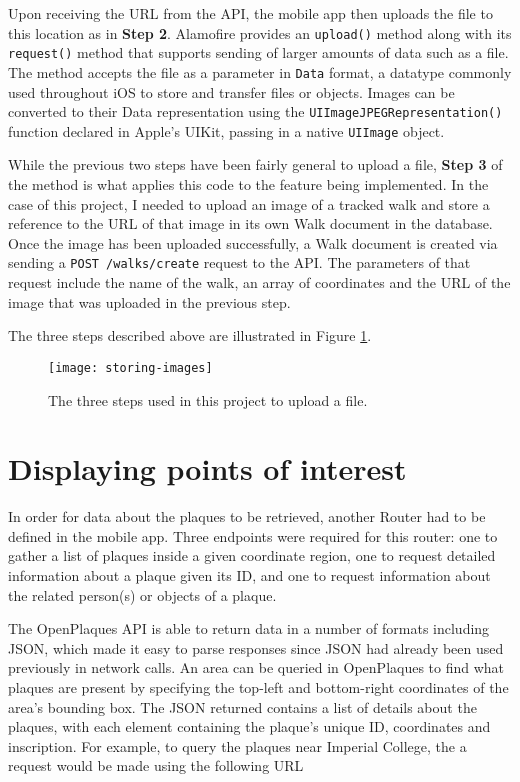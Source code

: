 Upon receiving the URL from the API, the mobile app then uploads the file to this location as in \textbf{Step 2}. Alamofire provides an \texttt{upload()} method along with its \texttt{request()} method that supports sending of larger amounts of data such as a file. The method accepts the file as a parameter in \texttt{Data} format, a datatype commonly used throughout iOS to store and transfer files or objects. Images can be converted to their Data representation using the \texttt{UIImageJPEGRepresentation()} function declared in Apple's UIKit, passing in a native \texttt{UIImage} object.

While the previous two steps have been fairly general to upload a file, \textbf{Step 3} of the method is what applies this code to the feature being implemented. In the case of this project, I needed to upload an image of a tracked walk and store a reference to the URL of that image in its own Walk document in the database. Once the image has been uploaded successfully, a Walk document is created via sending a \texttt{POST /walks/create} request to the API. The parameters of that request include the name of the walk, an array of coordinates and the URL of the image that was uploaded in the previous step.

The three steps described above are illustrated in Figure \ref{fig:storing-images}.

\begin{figure}[hbt]
  \centering
  \texttt{[image: storing-images]}
  \caption{The three steps used in this project to upload a file.}
  \label{fig:storing-images}
\end{figure}

\section{Displaying points of interest}

In order for data about the plaques to be retrieved, another Router had to be defined in the mobile app. Three endpoints were required for this router: one to gather a list of plaques inside a given coordinate region, one to request detailed information about a plaque given its ID, and one to request information about the related person(s) or objects of a plaque.

The OpenPlaques API is able to return data in a number of formats including JSON, which made it easy to parse responses since JSON had already been used previously in network calls. An area can be queried in OpenPlaques to find what plaques are present by specifying the top-left and bottom-right coordinates of the area's bounding box. The JSON returned contains a list of details about the plaques, with each element containing the plaque's unique ID, coordinates and inscription. For example, to query the plaques near Imperial College, the a request would be made using the following URL

